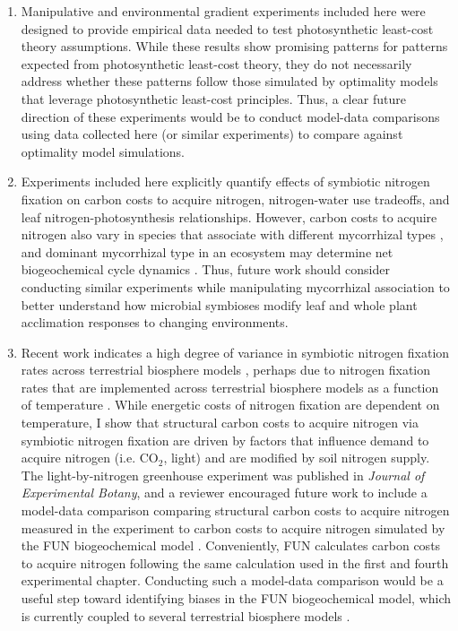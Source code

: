 \begin{enumerate}
    \item Manipulative and environmental gradient experiments included here were designed to provide empirical data needed to test photosynthetic least-cost theory assumptions. While these results show promising patterns for patterns expected from photosynthetic least-cost theory, they do not necessarily address whether these patterns follow those simulated by optimality models that leverage photosynthetic least-cost principles. Thus, a clear future direction of these experiments would be to conduct model-data comparisons using data collected here (or similar experiments) to compare against optimality model simulations.
    
    \item Experiments included here explicitly quantify effects of symbiotic nitrogen fixation on carbon costs to acquire nitrogen, nitrogen-water use tradeoffs, and leaf nitrogen-photosynthesis relationships. However, carbon costs to acquire nitrogen also vary in species that associate with different mycorrhizal types , and dominant mycorrhizal type in an ecosystem may determine net biogeochemical cycle dynamics . Thus, future work should consider conducting similar experiments while manipulating mycorrhizal association to better understand how microbial symbioses modify leaf and whole plant acclimation responses to changing environments. 
    
    \item Recent work indicates a high degree of variance in symbiotic nitrogen fixation rates across terrestrial biosphere models , perhaps due to nitrogen fixation rates that are implemented across terrestrial biosphere models as a function of temperature . While energetic costs of nitrogen fixation are dependent on temperature, I show that structural carbon costs to acquire nitrogen via symbiotic nitrogen fixation are driven by factors that influence demand to acquire nitrogen (i.e. CO$_2$, light) and are modified by soil nitrogen supply. The light-by-nitrogen greenhouse experiment was published in \textit{Journal of Experimental Botany}, and a reviewer encouraged future work to include a model-data comparison comparing structural carbon costs to acquire nitrogen measured in the experiment to carbon costs to acquire nitrogen simulated by the FUN biogeochemical model . Conveniently, FUN calculates carbon costs to acquire nitrogen following the same calculation used in the first and fourth experimental chapter. Conducting such a model-data comparison would be a useful step toward identifying biases in the FUN biogeochemical model, which is currently coupled to several terrestrial biosphere models .


\end{enumerate}
